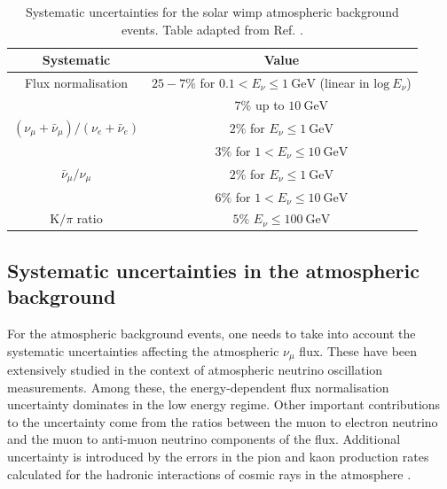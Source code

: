 \begin{table}[t]
	\caption[Systematic uncertainties for the solar \gls{wimp} atmospheric background events.]{Systematic uncertainties for the solar \gls{wimp} atmospheric background events. Table adapted from Ref. \cite{Super-Kamiokande2017}.}
	\begin{center}
		\begin{small}
			\begin{tabular}{c|c}
				Systematic                                            & Value \\[2mm] \hline
				\rule{0pt}{1.1\normalbaselineskip}Flux normalisation                                    & $25-7\%$ for $0.1 < E_{\nu} \leq 1~\mathrm{GeV}$ (linear in $\mathrm{log} ~ E_{\nu}$)\\[1mm] & $7\%$ up to $10~\mathrm{GeV}$ \\[2mm]
				$(\nu_{\mu}+\bar{\nu}_{\mu})/(\nu_{e}+\bar{\nu}_{e})$ & $2\%$ for $E_{\nu} \leq 1~\mathrm{GeV}$ \\[1mm] & $3\%$ for $1 < E_{\nu} \leq 10~\mathrm{GeV}$ \\[2mm]
				$\bar{\nu}_{\mu}/\nu_{\mu}$                           & $2\%$ for $E_{\nu} \leq 1~\mathrm{GeV}$ \\[1mm] & $6\%$ for $1 < E_{\nu} \leq 10~\mathrm{GeV}$ \\[2mm]
				$\mathrm{K}/\pi$ ratio                                & $5\%$ $E_{\nu} \leq 100~\mathrm{GeV}$
			\end{tabular}
		\end{small}
	\end{center}
	\label{tab:solar_dm_background_uncertainties}
\end{table}

\subsection{Systematic uncertainties in the atmospheric background}

For the atmospheric background events, one needs to take into account the systematic uncertainties affecting the atmospheric $\nu_{\mu}$ flux. These have been extensively studied in the context of atmospheric neutrino oscillation measurements. Among these, the energy-dependent flux normalisation uncertainty dominates in the low energy regime. Other important contributions to the uncertainty come from the ratios between the muon to electron neutrino and the muon to anti-muon neutrino components of the flux. Additional uncertainty is introduced by the errors in the pion and kaon production rates calculated for the hadronic interactions of cosmic rays in the atmosphere \cite{Honda2006}.

